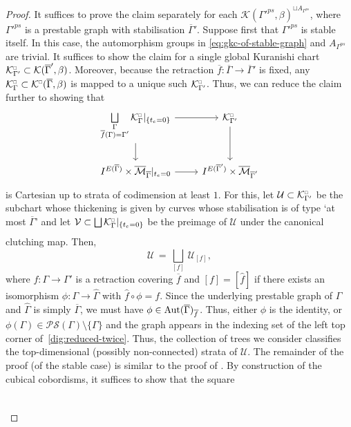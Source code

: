 \documentclass[11pt,psamsfonts, oneside, reqno]{amsart}
\newcommand{\sub}{\subset}%
\newcommand{\sm}{\ensuremath{\setminus}}%
\newcommand{\g}{\circ}%
\newcommand{\cl}{\colon}
\newcommand{\djun}[1]{\bigsqcup\limits_{#1}}
\newcommand{\scP}{\mathscr{P}}
\newcommand{\scS}{\mathscr{S}}
\newcommand{\Mbar}{\overline{\mathcal M}}
\newcommand{\Aut}{\normalfont\text{Aut}}
\newcommand{\cK}{\mathcal{K}}
\newcommand{\cU}{\mathcal{U}}
\newcommand{\cV}{\mathcal{V}}
\newcommand{\wh}{\widehat}
\newcommand{\ov}[1]{\overline{#1}}
\newcommand{\cKc}{\cK^{\scale{\square}{0.6}}}
\newcommand{\scale}[2]{\scaleobj{#2}{#1}}
\theoremstyle{definition}
\theoremstyle{remark}
\numberwithin{equation}{section}
\begin{document}
\begin{proof} It suffices to prove the claim separately for each $\cK({\Gamma'}^{ps},\beta)^{\sqcup A_{\Gamma^{ps}}}$, where ${\Gamma'}^{ps}$ is a prestable graph with stabilisation $\ov\Gamma'$. Suppose first that ${\Gamma'}^{ps}$ is stable itself. In this case, the automorphism groups in \eqref{eq:gkc-of-stable-graph} and $A_{\Gamma^{ps}}$ are trivial. It suffices to show the claim for a single global Kuranishi chart $\cKc_{\Gamma'}\sub \cK(\ov\Gamma',\beta)$. Moreover, because the retraction $\ov{f}\cl \ov\Gamma\to \ov\Gamma'$ is fixed, any $\cKc_{\Gamma}\sub \cKc(\ov\Gamma,\beta)$ is mapped to a unique such $\cKc_{\Gamma'}$. Thus, we can reduce the claim further to showing that
	\begin{equation}\label{dig:reduced-twice}\begin{tikzcd}
			\djun{\substack{\Gamma\\ \ov{f}(\Gamma) = \Gamma'}}\cKc_{\Gamma}|_{\{t_e = 0\}} \arrow[r,""] \arrow[d,""]&\cKc_{\Gamma'} \arrow[d,""]\\ 
			I^{E(\ov\Gamma)}\times\Mbar_{\ov\Gamma}|_{t_e = 0} \arrow[r,""] & I^{E(\ov\Gamma')}\times\Mbar_{\ov\Gamma'}\end{tikzcd} \end{equation}
	is Cartesian up to strata of codimension at least $1$. For this, let $\cU\sub \cKc_{\Gamma'}$ be the subchart whose thickening is given by curves whose stabilisation is of type `at most $\ov\Gamma$' and let $\cV\sub \djun{}\cKc_{\Gamma}|_{\{t_e = 0\}}$ be the preimage of $\cU$ under the canonical clutching map. Then, 
	\[\cU\,=\, \djun{[f]}\,\cU_{[f]},\] 
	where $f \cl \Gamma\to \Gamma'$ is a retraction covering $\ov{f}$ and $[f]= [\wh{f}]$ if there exists an isomorphism $\phi\cl \Gamma\to \wh\Gamma$ with $\wh{f}\g \phi = f$. Since the underlying prestable graph of $\Gamma$ and $\wh\Gamma$ is simply $\ov\Gamma$, we must have $\phi\in \Aut(\ov\Gamma)_{\ov{f}}$. Thus, either $\phi$ is the identity, or $\phi(\Gamma)\in \scP\scS(\Gamma)\sm\{\Gamma\}$ and the graph appears in the indexing set of the left top corner of~\eqref{dig:reduced-twice}. Thus, the collection of trees we consider classifies the top-dimensional (possibly non-connected) strata of $\cU$. The remainder of the proof (of the stable case) is similar to the proof of \cite[Lemma~7.3]{HS22}. By construction of the cubical cobordisms, it suffices to show that the square
	\begin{equation}\label{eq:square-with-thickenings}
		\begin{tikzcd}

\end{tikzcd}
\end{equation}
\end{proof}
\end{document}
